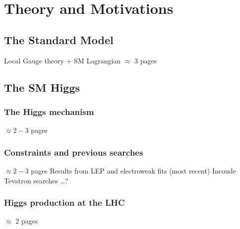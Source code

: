 \chapter{Theory and Motivations}
\label{theory}

\section{The Standard Model}
Local Gauge theory + SM Lagrangian
$\approx$ 3 pages 

\section{The SM Higgs}

\subsection{The Higgs mechanism}
$\approx 2-3$ pages
\subsection{Constraints and previous searches}
$\approx 2-3$ pages
Results from LEP and electroweak fits (most recent)
Incoude Tevatron searches \ldots ?
\subsection{Higgs production at the LHC}
$\approx$ 2 pages

